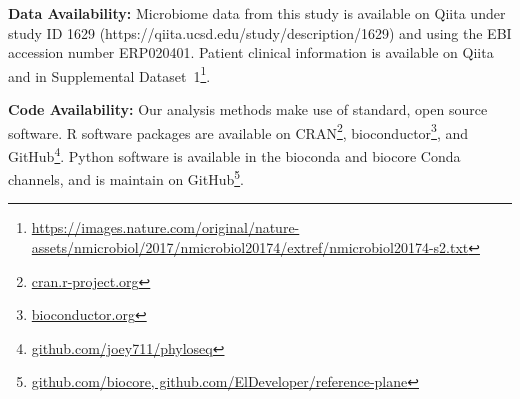 \textbf{Data Availability:} Microbiome data from this study is available on Qiita under study ID 1629 (https://qiita.ucsd.edu/study/description/1629) and using the EBI accession number ERP020401. Patient clinical information is available on Qiita and in Supplemental Dataset~1\footnote{\url{https://images.nature.com/original/nature-assets/nmicrobiol/2017/nmicrobiol20174/extref/nmicrobiol20174-s2.txt}}. 

\textbf{Code Availability:} Our analysis methods make use of standard, open source software. R software packages are available on CRAN\footnote{\url{cran.r-project.org}}, bioconductor\footnote{\url{bioconductor.org}}, and GitHub\footnote{\url{github.com/joey711/phyloseq}}. Python software is available in the bioconda and biocore Conda channels, and is maintain on GitHub\footnote{\url{github.com/biocore, github.com/ElDeveloper/reference-plane}}.

